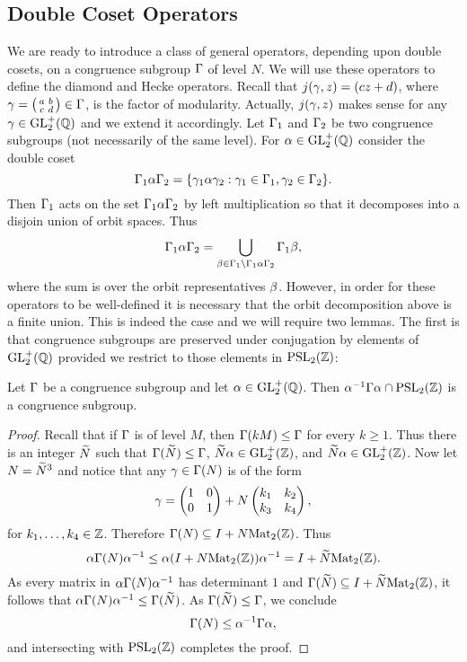     \subsection*{Double Coset Operators}
      We are ready to introduce a class of general operators, depending upon double cosets, on a congruence subgroup $\Gamma$ of level $N$. We will use these operators to define the diamond and Hecke operators. Recall that $j(\gamma,z) = (cz+d)$, where $\gamma = \begin{psmallmatrix} a & b \\ c & d \end{psmallmatrix} \in \Gamma$, is the factor of modularity. Actually, $j(\gamma,z)$ makes sense for any $\gamma \in \mathrm{GL}_{2}^{+}(\mathbb{Q})$ and we extend it accordingly. Let $\Gamma_{1}$ and $\Gamma_{2}$ be two congruence subgroups (not necessarily of the same level). For $\alpha \in \mathrm{GL}_{2}^{+}(\mathbb{Q})$ consider the double coset
      \[
        \Gamma_{1}\alpha\Gamma_{2} = \{\gamma_{1}\alpha\gamma_{2}:\gamma_{1} \in \Gamma_{1}, \gamma_{2} \in \Gamma_{2}\}.
      \]
      Then $\Gamma_{1}$ acts on the set $\Gamma_{1}\alpha\Gamma_{2}$ by left multiplication so that it decomposes into a disjoin union of orbit spaces. Thus
      \[
        \Gamma_{1}\alpha\Gamma_{2} = \bigcup_{\beta \in \Gamma_{1}\backslash\Gamma_{1}\alpha\Gamma_{2}}\Gamma_{1}\beta,
      \]
      where the sum is over the orbit representatives $\beta$. However, in order for these operators to be well-defined it is necessary that the orbit decomposition above is a finite union. This is indeed the case and we will require two lemmas. The first is that congruence subgroups are preserved under conjugation by elements of $\mathrm{GL}_{2}^{+}(\mathbb{Q})$ provided we restrict to those elements in $\mathrm{PSL}_{2}(\mathbb{Z})$:

      \begin{lemma}\label{lem:coset_lemma_1}
        Let $\Gamma$ be a congruence subgroup and let $\alpha \in \mathrm{GL}_{2}^{+}(\mathbb{Q})$. Then $\alpha^{-1}\Gamma\alpha \cap \mathrm{PSL}_{2}(\mathbb{Z})$ is a congruence subgroup.
      \end{lemma}
      \begin{proof}
        Recall that if $\Gamma$ is of level $M$, then $\Gamma(kM) \le \Gamma$ for every $k \ge 1$. Thus there is an integer $\widetilde{N}$ such that $\Gamma(\widetilde{N}) \le \Gamma$, $\widetilde{N}\alpha \in \mathrm{GL}_{2}^{+}(\mathbb{Z})$, and $\widetilde{N}\alpha \in \mathrm{GL}_{2}^{+}(\mathbb{Z})$. Now let $N = \widetilde{N}^{3}$ and notice that any $\gamma \in \Gamma(N)$ is of the form
        \[
          \gamma = \begin{pmatrix} 1 & 0 \\ 0 & 1 \end{pmatrix}+N\begin{pmatrix} k_{1} & k_{2} \\ k_{3} & k_{4} \end{pmatrix},
        \]
        for $k_{1},\ldots,k_{4} \in \mathbb{Z}$. Therefore $\Gamma(N) \subseteq I+N\mathrm{Mat}_{2}(\mathbb{Z})$. Thus
        \[
          \alpha\Gamma(N)\alpha^{-1} \le \alpha(I+N\mathrm{Mat}_{2}(\mathbb{Z}))\alpha^{-1} = I+\widetilde{N}\mathrm{Mat}_{2}(\mathbb{Z}).
        \]
        As every matrix in $\alpha\Gamma(N)\alpha^{-1}$ has determinant $1$ and $\Gamma(\widetilde{N}) \subseteq I+\widetilde{N}\mathrm{Mat}_{2}(\mathbb{Z})$, it follows that $\alpha\Gamma(N)\alpha^{-1} \le \Gamma(\widetilde{N})$. As $\Gamma(\widetilde{N}) \le \Gamma$, we conclude
        \[
          \Gamma(N) \le \alpha^{-1}\Gamma\alpha,
        \]
        and intersecting with $\mathrm{PSL}_{2}(\mathbb{Z})$ completes the proof.
      \end{proof}

